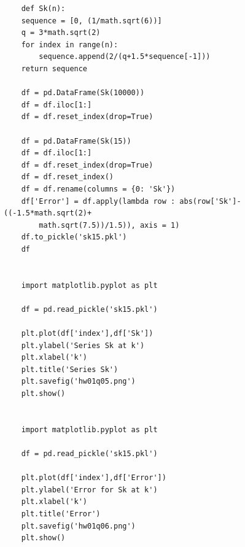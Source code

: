 \documentclass{article}
\begin{document}
\begin{verbatim}
    def Sk(n):
    sequence = [0, (1/math.sqrt(6))]
    q = 3*math.sqrt(2)
    for index in range(n):
        sequence.append(2/(q+1.5*sequence[-1]))
    return sequence
    
    df = pd.DataFrame(Sk(10000))
    df = df.iloc[1:]
    df = df.reset_index(drop=True)
    
    df = pd.DataFrame(Sk(15))
    df = df.iloc[1:]
    df = df.reset_index(drop=True)
    df = df.reset_index()
    df = df.rename(columns = {0: 'Sk'})
    df['Error'] = df.apply(lambda row : abs(row['Sk']-((-1.5*math.sqrt(2)+
        math.sqrt(7.5))/1.5)), axis = 1) 
    df.to_pickle('sk15.pkl')
    df
    
    
    import matplotlib.pyplot as plt

    df = pd.read_pickle('sk15.pkl')

    plt.plot(df['index'],df['Sk'])
    plt.ylabel('Series Sk at k')
    plt.xlabel('k')
    plt.title('Series Sk')
    plt.savefig('hw01q05.png')
    plt.show()
    
    
    import matplotlib.pyplot as plt

    df = pd.read_pickle('sk15.pkl')

    plt.plot(df['index'],df['Error'])
    plt.ylabel('Error for Sk at k')
    plt.xlabel('k')
    plt.title('Error')
    plt.savefig('hw01q06.png')
    plt.show()
\end{verbatim}
\end{document}
